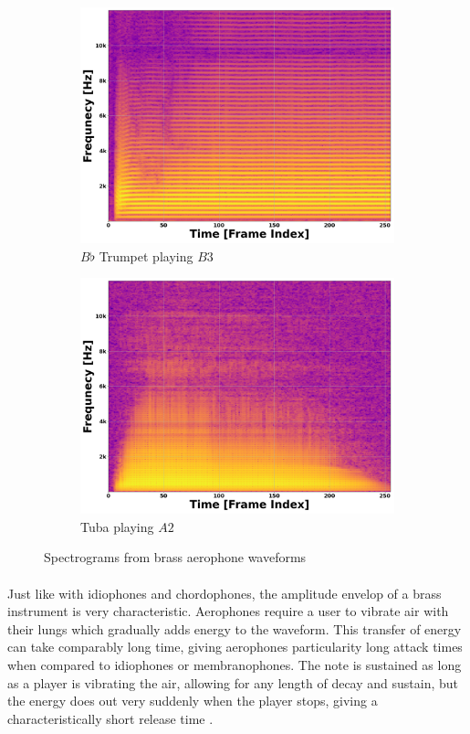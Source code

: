 \documentclass[12pt,letterpaper]{article}
\begin{document}
\begin{figure}[H]
	\begin{subfigure}{0.45\textwidth}
	\centering
	\includegraphics[scale=0.2]{../FiguresSpectrogram/Trumpet-B3}
	\caption{$B\flat$ Trumpet playing $B3$}
	\end{subfigure}
	\hfill
	\begin{subfigure}{0.45\textwidth}
	\centering
	\includegraphics[scale=0.2]{../FiguresSpectrogram/Tuba-A2}
	\caption{Tuba playing $A2$}
	\end{subfigure}
\caption{Spectrograms from brass aerophone waveforms}	
\label{fig-PropertiesAerophonesBrass}
\end{figure}

\paragraph*{}Just like with idiophones and chordophones, the amplitude envelop of a brass instrument is very characteristic. Aerophones require a user to vibrate air with their lungs which gradually adds energy to the waveform. This transfer of energy can take comparably long time, giving aerophones particularity long attack times when compared to idiophones or membranophones. The note is sustained as long as a player is vibrating the air, allowing for any length of decay and sustain, but the energy does out very suddenly when the player stops, giving a characteristically short release time \cite{White}. 
\end{document}
